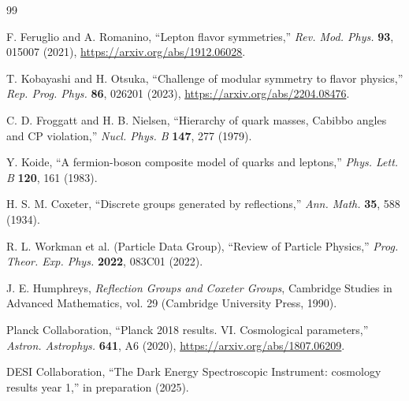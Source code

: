 \documentclass[11pt,a4paper]{article}
\begin{document}
\begin{thebibliography}{99}

F. Feruglio and A. Romanino,
``Lepton flavor symmetries,''
\textit{Rev. Mod. Phys.} \textbf{93}, 015007 (2021), \url{https://arxiv.org/abs/1912.06028}.

T. Kobayashi and H. Otsuka,
``Challenge of modular symmetry to flavor physics,''
\textit{Rep. Prog. Phys.} \textbf{86}, 026201 (2023), \url{https://arxiv.org/abs/2204.08476}.

C. D. Froggatt and H. B. Nielsen,
``Hierarchy of quark masses, Cabibbo angles and CP violation,''
\textit{Nucl. Phys. B} \textbf{147}, 277 (1979).

Y. Koide,
``A fermion-boson composite model of quarks and leptons,''
\textit{Phys. Lett. B} \textbf{120}, 161 (1983).

H. S. M. Coxeter,
``Discrete groups generated by reflections,''
\textit{Ann. Math.} \textbf{35}, 588 (1934).

R. L. Workman et al. (Particle Data Group),
``Review of Particle Physics,''
\textit{Prog. Theor. Exp. Phys.} \textbf{2022}, 083C01 (2022).

J. E. Humphreys,
\textit{Reflection Groups and Coxeter Groups},
Cambridge Studies in Advanced Mathematics, vol. 29
(Cambridge University Press, 1990).

Planck Collaboration,
``Planck 2018 results. VI. Cosmological parameters,''
\textit{Astron. Astrophys.} \textbf{641}, A6 (2020), \url{https://arxiv.org/abs/1807.06209}.

DESI Collaboration,
``The Dark Energy Spectroscopic Instrument: cosmology results year 1,''
in preparation (2025).

\end{thebibliography}
\end{document}
